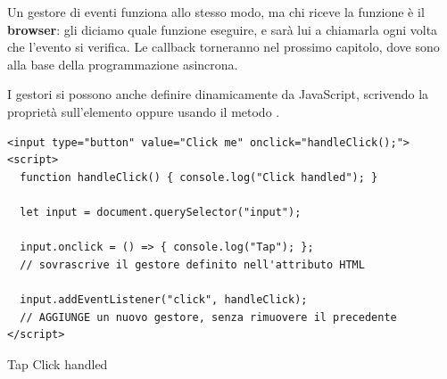 Un gestore di eventi funziona allo stesso modo, ma chi riceve la funzione è il
\textbf{browser}: gli diciamo quale funzione eseguire, e sarà lui a chiamarla
ogni volta che l'evento si verifica. Le callback torneranno nel prossimo
capitolo, dove sono alla base della programmazione asincrona.

I gestori si possono anche definire dinamicamente da JavaScript, scrivendo la
proprietà  sull'elemento oppure usando il metodo
.

\begin{affianco}[0.58][c]
\begin{lstlisting}[style=html, name=handler-dinamico.html]
<input type="button" value="Click me" onclick="handleClick();">
<script>
  function handleClick() { console.log("Click handled"); }

  let input = document.querySelector("input");

  input.onclick = () => { console.log("Tap"); };
  // sovrascrive il gestore definito nell'attributo HTML

  input.addEventListener("click", handleClick);
  // AGGIUNGE un nuovo gestore, senza rimuovere il precedente
</script>
\end{lstlisting}
\risultato
\begin{immagine}
\end{immagine}
\begin{console}
Tap
Click handled
\end{console}
\end{affianco}


